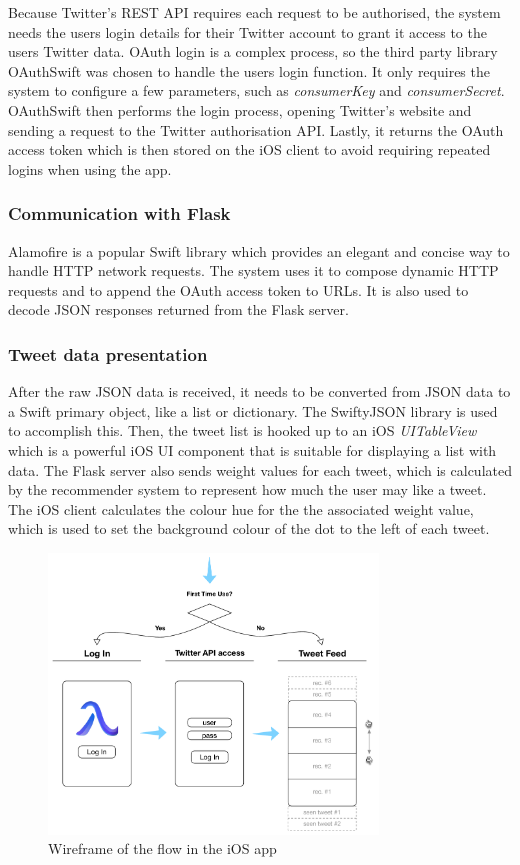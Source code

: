 \documentclass{article}
\begin{document}
Because Twitter's REST API requires each request to be authorised, the system needs the users login details for their Twitter account to grant it access to the users Twitter data. OAuth login is a complex process, so the third party library OAuthSwift \cite{oauthswift} was chosen to handle the users login function. It only requires the system to configure a few parameters, such as \textit{consumerKey} and \textit{consumerSecret}. OAuthSwift then performs the login process, opening Twitter's website and sending a request to the Twitter authorisation API. Lastly, it returns the OAuth access token which is then stored on the iOS client to avoid requiring repeated logins when using the app.

\subsubsection*{Communication with Flask} 
Alamofire \cite{alamofire} is a popular Swift library which provides an elegant and concise way to handle HTTP network requests. The system uses it to compose dynamic HTTP requests and to append the OAuth access token to URLs. It is also used to decode JSON responses returned from the Flask server.

\subsubsection*{Tweet data presentation} 
After the raw JSON data is received, it needs to be converted from JSON data to a Swift primary object, like a list or dictionary. The SwiftyJSON \cite{swiftyjson} library is used to accomplish this. Then, the tweet list is hooked up to an iOS \textit{UITableView} which is a powerful iOS UI component that is suitable for displaying a list with data. The Flask server also sends weight values for each tweet, which is calculated by the recommender system to represent how much the user may like a tweet. The iOS client calculates the colour hue for the the associated weight value, which is used to set the background colour of the dot to the left of each tweet.


\newpage


\begin{figure}[H]
    \centering
    \includegraphics[width=0.78\textwidth]{ios_wireframe_1}  
    \caption{Wireframe of the flow in the iOS app}
\end{figure}
\end{document}
